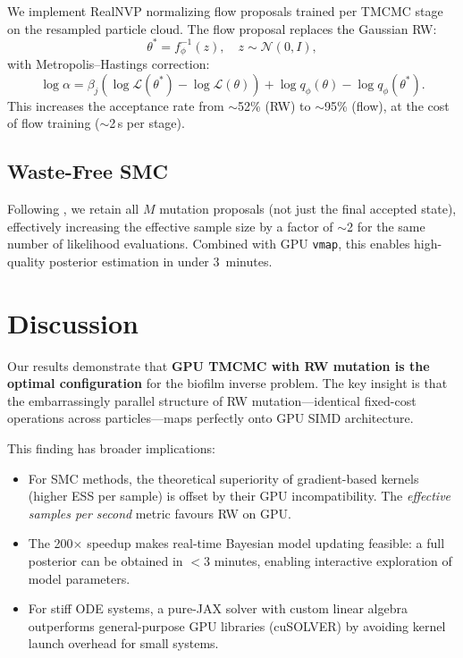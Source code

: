 \documentclass[11pt,a4paper]{article}
\begin{document}
We implement RealNVP normalizing flow proposals \cite{Arbel2021} trained
per TMCMC stage on the resampled particle cloud.  The flow proposal
replaces the Gaussian RW:
\begin{equation}
  \theta^* = f_\phi^{-1}(z), \quad z \sim \mathcal{N}(0, I),
\end{equation}
with Metropolis--Hastings correction:
\begin{equation}
  \log\alpha = \beta_j (\log\mathcal{L}(\theta^*) - \log\mathcal{L}(\theta))
    + \log q_\phi(\theta) - \log q_\phi(\theta^*).
\end{equation}
This increases the acceptance rate from $\sim$52\% (RW) to $\sim$95\%
(flow), at the cost of flow training ($\sim$2$\,$s per stage).

\subsection{Waste-Free SMC}

Following \cite{Dau2022}, we retain all $M$ mutation proposals
(not just the final accepted state), effectively increasing the
effective sample size by a factor of $\sim$2 for the same number
of likelihood evaluations.  Combined with GPU \texttt{vmap}, this
enables high-quality posterior estimation in under 3~minutes.


\section{Discussion}
\label{sec:gpu_discussion}

Our results demonstrate that \textbf{GPU TMCMC with RW mutation is the
optimal configuration} for the biofilm inverse problem.  The key insight
is that the embarrassingly parallel structure of RW mutation---identical
fixed-cost operations across particles---maps perfectly onto GPU SIMD
architecture.

This finding has broader implications:
\begin{itemize}
  \item For SMC methods, the theoretical superiority of gradient-based
    kernels (higher ESS per sample) is offset by their GPU incompatibility.
    The \emph{effective samples per second} metric favours RW on GPU.
  \item The 200$\times$ speedup makes real-time Bayesian model updating
    feasible: a full posterior can be obtained in $<$3 minutes, enabling
    interactive exploration of model parameters.
  \item For stiff ODE systems, a pure-JAX solver with custom linear
    algebra outperforms general-purpose GPU libraries (cuSOLVER) by
    avoiding kernel launch overhead for small systems.
\end{itemize}
\end{document}
